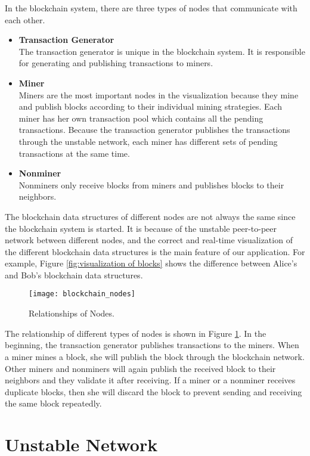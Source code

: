 In the blockchain system, there are three types of nodes that communicate with each other. 
\begin{itemize}
    \item \textbf{Transaction Generator} \\
        The transaction generator is unique in the blockchain system. It is responsible for generating and publishing transactions to miners.
    \item \textbf{Miner} \\
        Miners are the most important nodes in the visualization because they mine and publish blocks according to their individual mining strategies. Each miner has her own transaction pool which contains all the pending transactions. Because the transaction generator publishes the transactions through the unstable network, each miner has different sets of pending transactions at the same time.
    \item \textbf{Nonminer} \\
        Nonminers only receive blocks from miners and publishes blocks to their neighbors.
\end{itemize}

The blockchain data structures of different nodes are not always the same since the blockchain system is started. It is because of the unstable peer-to-peer network between different nodes, and the correct and real-time visualization of the different blockchain data structures is the main feature of our application. For example, Figure \ref{fig:visualization of blocks} shows the difference between Alice's and Bob's blockchain data structures.

\begin{figure}[htb]
    \centering
    \texttt{[image: blockchain\_nodes]}
    \caption{Relationships of Nodes.}
    \label{fig:relationship of nodes}
\end{figure}

The relationship of different types of nodes is shown in Figure \ref{fig:relationship of nodes}. In the beginning, the transaction generator publishes transactions to the miners. When a miner mines a block, she will publish the block through the blockchain network. Other miners and nonminers will again publish the received block to their neighbors and they validate it after receiving. If a miner or a nonminer receives duplicate blocks, then she will discard the block to prevent sending and receiving the same block repeatedly.

\section{Unstable Network}

